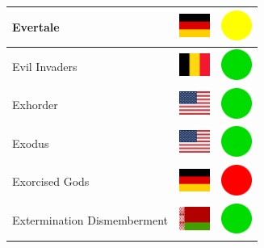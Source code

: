 \documentclass[12pt, a4paper, twoside]{report}
\begin{document}
\begin{center}
\begin{longtable}{|p{5cm}|p{2cm}|p{2cm}|}
Evertale & \includegraphics[width=1cm]{4x3/de} & \includegraphics[width=1cm]{likes/m} \\ \hline
Evil Invaders & \includegraphics[width=1cm]{4x3/be} & \includegraphics[width=1cm]{likes/y} \\ \hline
Exhorder & \includegraphics[width=1cm]{4x3/us} & \includegraphics[width=1cm]{likes/y} \\ \hline
Exodus & \includegraphics[width=1cm]{4x3/us} & \includegraphics[width=1cm]{likes/y} \\ \hline
Exorcised Gods & \includegraphics[width=1cm]{4x3/de} & \includegraphics[width=1cm]{likes/n} \\ \hline
Extermination Dismemberment & \includegraphics[width=1cm]{4x3/by} & \includegraphics[width=1cm]{likes/y} \\ \hline

\end{longtable}
\end{center}
\end{document}
